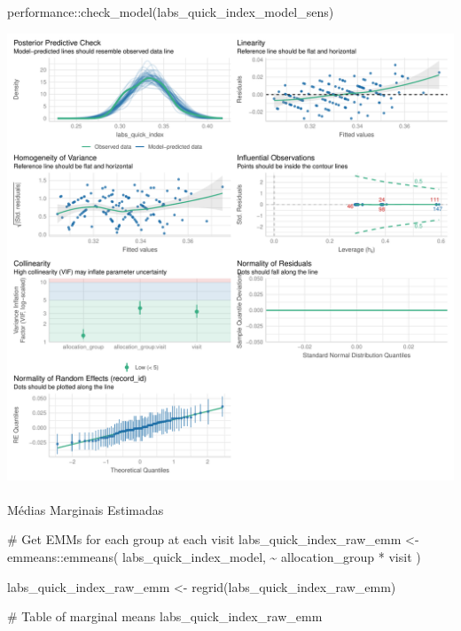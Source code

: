 \documentclass[
  letterpaper,
  DIV=11,
  numbers=noendperiod]{scrartcl}
\makeatletter
\let\oldparagraph\paragraph
\renewcommand{\paragraph}{
    \@ifstar
      \xxxParagraphStar
      \xxxParagraphNoStar
  }
\newcommand{\xxxParagraphStar}[1]{\oldparagraph*{#1}\mbox{}}
\newcommand{\xxxParagraphNoStar}[1]{\oldparagraph{#1}\mbox{}}
\newenvironment{Shaded}{\begin{snugshade}}{\end{snugshade}}
\newcommand{\CommentTok}[1]{\textcolor[rgb]{0.37,0.37,0.37}{#1}}
\newcommand{\FunctionTok}[1]{\textcolor[rgb]{0.28,0.35,0.67}{#1}}
\newcommand{\NormalTok}[1]{\textcolor[rgb]{0.00,0.23,0.31}{#1}}
\newcommand{\OtherTok}[1]{\textcolor[rgb]{0.00,0.23,0.31}{#1}}
\newcommand{\SpecialCharTok}[1]{\textcolor[rgb]{0.37,0.37,0.37}{#1}}
\makeatother
\begin{document}
\begin{Shaded}
\begin{Highlighting}[]
\NormalTok{performance}\SpecialCharTok{::}\FunctionTok{check\_model}\NormalTok{(labs\_quick\_index\_model\_sens)}
\end{Highlighting}
\end{Shaded}

\includegraphics{Outcomes_V1V2V3_files/figure-pdf/labs_quick_index_4-2.pdf}

\paragraph{Médias Marginais
Estimadas}\label{muxe9dias-marginais-estimadas-12}

\begin{Shaded}
\begin{Highlighting}[]
\CommentTok{\# Get EMMs for each group at each visit}
\NormalTok{labs\_quick\_index\_raw\_emm }\OtherTok{\textless{}{-}}\NormalTok{ emmeans}\SpecialCharTok{::}\FunctionTok{emmeans}\NormalTok{(}
\NormalTok{    labs\_quick\_index\_model, }
    \SpecialCharTok{\textasciitilde{}}\NormalTok{ allocation\_group }\SpecialCharTok{*}\NormalTok{ visit}
\NormalTok{)}

\NormalTok{labs\_quick\_index\_raw\_emm }\OtherTok{\textless{}{-}} \FunctionTok{regrid}\NormalTok{(labs\_quick\_index\_raw\_emm)}

\CommentTok{\# Table of marginal means}
\NormalTok{labs\_quick\_index\_raw\_emm}
\end{Highlighting}
\end{Shaded}
\end{document}
